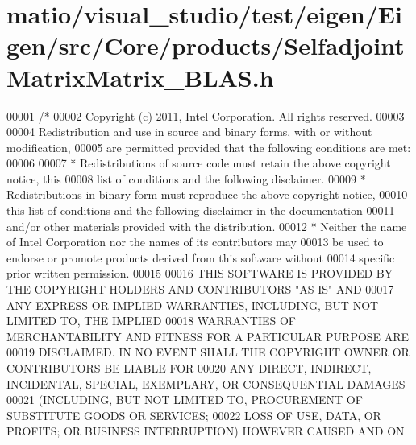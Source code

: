 \hypertarget{matio_2visual__studio_2test_2eigen_2_eigen_2src_2_core_2products_2_selfadjoint_matrix_matrix___b_l_a_s_8h_source}{}\section{matio/visual\+\_\+studio/test/eigen/\+Eigen/src/\+Core/products/\+Selfadjoint\+Matrix\+Matrix\+\_\+\+B\+L\+AS.h}
\label{matio_2visual__studio_2test_2eigen_2_eigen_2src_2_core_2products_2_selfadjoint_matrix_matrix___b_l_a_s_8h_source}

\begin{DoxyCode}
00001 \textcolor{comment}{/*}
00002 \textcolor{comment}{ Copyright (c) 2011, Intel Corporation. All rights reserved.}
00003 \textcolor{comment}{}
00004 \textcolor{comment}{ Redistribution and use in source and binary forms, with or without modification,}
00005 \textcolor{comment}{ are permitted provided that the following conditions are met:}
00006 \textcolor{comment}{}
00007 \textcolor{comment}{ * Redistributions of source code must retain the above copyright notice, this}
00008 \textcolor{comment}{   list of conditions and the following disclaimer.}
00009 \textcolor{comment}{ * Redistributions in binary form must reproduce the above copyright notice,}
00010 \textcolor{comment}{   this list of conditions and the following disclaimer in the documentation}
00011 \textcolor{comment}{   and/or other materials provided with the distribution.}
00012 \textcolor{comment}{ * Neither the name of Intel Corporation nor the names of its contributors may}
00013 \textcolor{comment}{   be used to endorse or promote products derived from this software without}
00014 \textcolor{comment}{   specific prior written permission.}
00015 \textcolor{comment}{}
00016 \textcolor{comment}{ THIS SOFTWARE IS PROVIDED BY THE COPYRIGHT HOLDERS AND CONTRIBUTORS "AS IS" AND}
00017 \textcolor{comment}{ ANY EXPRESS OR IMPLIED WARRANTIES, INCLUDING, BUT NOT LIMITED TO, THE IMPLIED}
00018 \textcolor{comment}{ WARRANTIES OF MERCHANTABILITY AND FITNESS FOR A PARTICULAR PURPOSE ARE}
00019 \textcolor{comment}{ DISCLAIMED. IN NO EVENT SHALL THE COPYRIGHT OWNER OR CONTRIBUTORS BE LIABLE FOR}
00020 \textcolor{comment}{ ANY DIRECT, INDIRECT, INCIDENTAL, SPECIAL, EXEMPLARY, OR CONSEQUENTIAL DAMAGES}
00021 \textcolor{comment}{ (INCLUDING, BUT NOT LIMITED TO, PROCUREMENT OF SUBSTITUTE GOODS OR SERVICES;}
00022 \textcolor{comment}{ LOSS OF USE, DATA, OR PROFITS; OR BUSINESS INTERRUPTION) HOWEVER CAUSED AND ON}

\end{DoxyCode}
